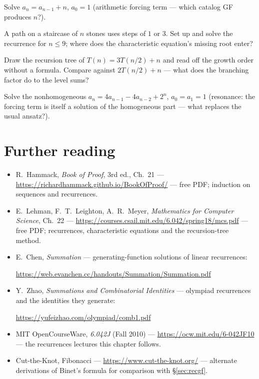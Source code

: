 \begin{exercise}[medium]
Solve $a_n = a_{n-1} + n$, $a_0 = 1$ (arithmetic forcing term ---
which catalog GF produces $n$?).
\end{exercise}
\begin{exercise}[medium]
A path on a staircase of $n$ stones uses steps of $1$ or $3$. Set up
and solve the recurrence for $n \le 9$; where does the characteristic
equation's missing root enter?
\end{exercise}
\begin{exercise}[medium]
Draw the recursion tree of $T(n) = 3T(n/2) + n$ and read off the
growth order without a formula. Compare against $2T(n/2)+n$ ---
what does the branching factor do to the level sums?
\end{exercise}
\begin{exercise}[hard]
Solve the nonhomogeneous $a_n = 4a_{n-1} - 4a_{n-2} + 2^n$,
$a_0 = a_1 = 1$ (resonance: the forcing term is itself a solution of
the homogeneous part --- what replaces the usual ansatz?).
\end{exercise}

\section*{Further reading}
\begin{itemize}
\item R.~Hammack, \emph{Book of Proof}, 3rd ed., Ch.~21 ---
\url{https://richardhammack.github.io/BookOfProof/}
--- free PDF;
induction on sequences and recurrences.
\item E.~Lehman, F.~T.~Leighton, A.~R.~Meyer, \emph{Mathematics for
Computer Science}, Ch.~22 ---
\url{https://courses.csail.mit.edu/6.042/spring18/mcs.pdf}
--- free PDF;
recurrences, characteristic equations and the recursion-tree method.
\item E.~Chen, \emph{Summation} --- generating-function solutions of
linear recurrences:

\url{https://web.evanchen.cc/handouts/Summation/Summation.pdf}
\item Y.~Zhao, \emph{Summations and Combinatorial Identities} ---
olympiad recurrences and the identities they generate:

\url{https://yufeizhao.com/olympiad/comb1.pdf}
\item MIT OpenCourseWare, \emph{6.042J} (Fall 2010) ---
\url{https://ocw.mit.edu/6-042JF10}
--- the recurrences lectures this
chapter follows.
\item Cut-the-Knot, Fibonacci ---
\url{https://www.cut-the-knot.org/}
--- alternate derivations of Binet's
formula for comparison with \S\ref{sec:recgf}.
\end{itemize}

